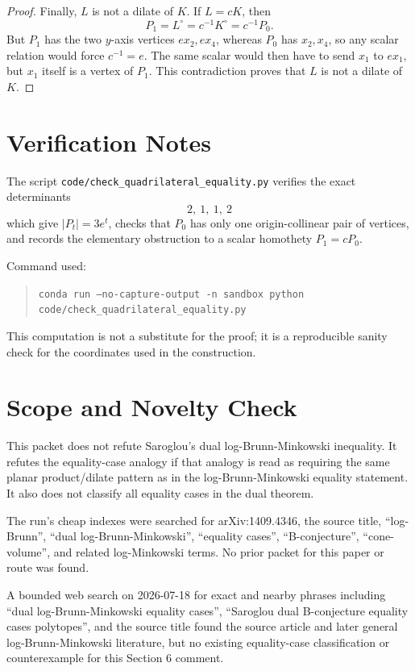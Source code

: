 \documentclass[11pt]{article}
\newcommand{\polar}{^\circ}
\begin{document}
\begin{proof}
Finally, \(L\) is not a dilate of \(K\).  If \(L=cK\), then
\[
   P_1=L\polar=c^{-1}K\polar=c^{-1}P_0.
\]
But \(P_1\) has the two \(y\)-axis vertices \(e x_2,e x_4\), whereas \(P_0\)
has \(x_2,x_4\), so any scalar relation would force \(c^{-1}=e\).  The same
scalar would then have to send \(x_1\) to \(e x_1\), but \(x_1\) itself is a
vertex of \(P_1\).  This contradiction proves that \(L\) is not a dilate of
\(K\).
\end{proof}

\section*{Verification Notes}

The script \texttt{code/check\_quadrilateral\_equality.py} verifies the exact
determinants
\[
   2,\ 1,\ 1,\ 2
\]
which give \(|P_t|=3e^t\), checks that \(P_0\) has only one origin-collinear
pair of vertices, and records the elementary obstruction to a scalar homothety
\(P_1=cP_0\).

Command used:
\begin{quote}
\texttt{conda run --no-capture-output -n sandbox python}\\
\texttt{code/check\_quadrilateral\_equality.py}
\end{quote}

This computation is not a substitute for the proof; it is a reproducible
sanity check for the coordinates used in the construction.

\section*{Scope and Novelty Check}

This packet does not refute Saroglou's dual log-Brunn-Minkowski inequality.
It refutes the equality-case analogy if that analogy is read as requiring the
same planar product/dilate pattern as in the log-Brunn-Minkowski equality
statement.  It also does not classify all equality cases in the dual theorem.

The run's cheap indexes were searched for arXiv:1409.4346, the source title,
``log-Brunn'', ``dual log-Brunn-Minkowski'', ``equality cases'',
``B-conjecture'', ``cone-volume'', and related log-Minkowski terms.  No prior
packet for this paper or route was found.

A bounded web search on 2026-07-18 for exact and nearby phrases including
``dual log-Brunn-Minkowski equality cases'', ``Saroglou dual B-conjecture
equality cases polytopes'', and the source title found the source article and
later general log-Brunn-Minkowski literature, but no existing equality-case
classification or counterexample for this Section 6 comment.
\end{document}
